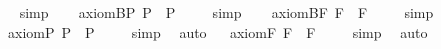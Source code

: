 \begin{isabellebody}
\isadelimproof
\ %
\endisadelimproof
%
\isatagproof
{}\isamarkupfalse%
\ simp\ \isamarkupfalse%
%
\endisatagproof
{\isafoldproof}%
%
\isadelimproof
%
\endisadelimproof
\isanewline
\isanewline
\ \isamarkupfalse%
\ axiom{\isacharunderscore}B{\isacharunderscore}P{\isacharcolon}\ {\isachardoublequoteopen}{\isacharbrackleft}{\isasymphi}\isactrlsup P\ \isactrlbold {\isasymrightarrow}\ \isactrlbold {\isasymbox}\isactrlbold {\isasymdiamond}{\isasymphi}\isactrlsup P{\isacharbrackright}\ {\isacharequal}\ {\isasymtop}{\isachardoublequoteclose}%
\isadelimproof
\ %
\endisadelimproof
%
\isatagproof
{}\isamarkupfalse%
\ simp\ \isamarkupfalse%
%
\endisatagproof
{\isafoldproof}%
%
\isadelimproof
%
\endisadelimproof
\isanewline
\ \isamarkupfalse%
\ axiom{\isacharunderscore}B{\isacharunderscore}F{\isacharcolon}\ {\isachardoublequoteopen}{\isacharbrackleft}{\isasymphi}\isactrlsup F\ \isactrlbold {\isasymrightarrow}\ \isactrlbold {\isasymbox}\isactrlbold {\isasymdiamond}{\isasymphi}\isactrlsup F{\isacharbrackright}\ {\isacharequal}\ {\isasymtop}{\isachardoublequoteclose}%
\isadelimproof
\ %
\endisadelimproof
%
\isatagproof
{}\isamarkupfalse%
\ simp\ \isamarkupfalse%
%
\endisatagproof
{\isafoldproof}%
%
\isadelimproof
%
\endisadelimproof
\isanewline
\isanewline
\ \isamarkupfalse%
\ axiom{\isacharunderscore}{}{\isacharunderscore}P{\isacharcolon}\ {\isachardoublequoteopen}{\isacharbrackleft}\isactrlbold {\isasymbox}{\isasymphi}\isactrlsup P\ \isactrlbold {\isasymrightarrow}\ \isactrlbold {\isasymdiamond}{\isasymphi}\isactrlsup P{\isacharbrackright}\ {\isacharequal}\ {\isasymtop}{\isachardoublequoteclose}%
\isadelimproof
\ %
\endisadelimproof
%
\isatagproof
{}\isamarkupfalse%
\ simp\ \isamarkupfalse%
\ auto%
\endisatagproof
{\isafoldproof}%
%
\isadelimproof
%
\endisadelimproof
\isanewline
\ \isamarkupfalse%
\ axiom{\isacharunderscore}{}{\isacharunderscore}F{\isacharcolon}\ {\isachardoublequoteopen}{\isacharbrackleft}\isactrlbold {\isasymbox}{\isasymphi}\isactrlsup F\ \isactrlbold {\isasymrightarrow}\ \isactrlbold {\isasymdiamond}{\isasymphi}\isactrlsup F{\isacharbrackright}\ {\isacharequal}\ {\isasymtop}{\isachardoublequoteclose}%
\isadelimproof
\ %
\endisadelimproof
%
\isatagproof
{}\isamarkupfalse%
\ simp\ \isamarkupfalse%
\ auto%
\endisatagproof
{\isafoldproof}%
%
\isadelimproof
%
\endisadelimproof
\isanewline
\isanewline
\ \isamarkupfalse%

\end{isabellebody}
